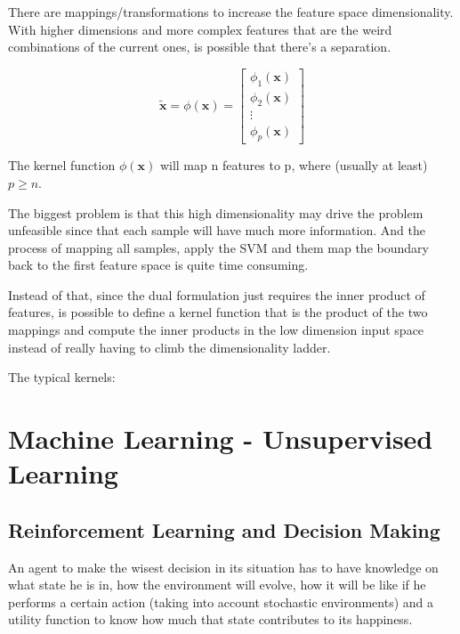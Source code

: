 There are mappings/transformations to increase the feature space dimensionality. With higher dimensions and more complex features that are the weird combinations of the current ones, is possible that there's a separation.

\begin{equation}
    \tilde{\mathbf{x}} = \phi(\mathbf{x}) = 
    \begin{bmatrix}
    \phi_1(\mathbf{x})\\
    \phi_2(\mathbf{x})\\
    \vdots\\
    \phi_p(\mathbf{x})
    \end{bmatrix}
\end{equation}

The kernel function $\phi(\mathbf{x})$ will map n features to p, where (usually at least) $p \geq n$.

The biggest problem is that this high dimensionality may drive the problem unfeasible since that each sample will have much more information. And the process of mapping all samples, apply the SVM and them map the boundary back to the first feature space is quite time consuming.

Instead of that, since the dual formulation just requires the inner product of features, is possible to define a kernel function that is the product of the two mappings and compute the inner products in the low dimension input space instead of really having to climb the dimensionality ladder.



The typical kernels:




\section{Machine Learning - Unsupervised Learning}

\subsection{Reinforcement Learning and Decision Making}


An agent to make the wisest decision in its situation has to have knowledge on what state he is in, how the environment will evolve, how it will be like if he performs a certain action (taking into account stochastic environments) and a utility function to  know how much that state contributes to its happiness.



